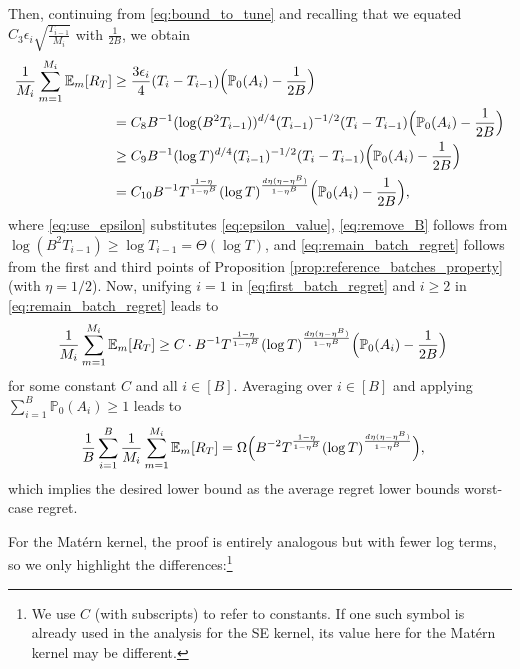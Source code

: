\documentclass[10pt]{article}
\begin{document}
Then, continuing from \eqref{eq:bound_to_tune} and recalling that we equated $C_{3}\epsilon_i \sqrt{\frac{T_{i-1}}{M_i}}$ with $\frac{1}{2B}$, we obtain
\begin{align}
    \frac{1}{M_i}\sum_{m=1}^{M_i}\mathbb{E}_m[R_T]
    & \geq \frac{3\epsilon_i}{4}(T_i-T_{i-1}) \Bigl(\mathbb{P}_0(A_i)- \frac{1}{2B} \Bigr) \label{eq:use_M} \\
    & = C_{8} B^{-1} (\log (B^2 T_{i-1}))^{d/4} (T_{i-1})^{-1/2}(T_i-T_{i-1}) \Bigl(\mathbb{P}_0(A_i)- \frac{1}{2B} \Bigr) \label{eq:use_epsilon} \\
    & \geq C_{9} B^{-1} (\log T)^{d/4} (T_{i-1})^{-1/2}(T_i-T_{i-1})\Bigl(\mathbb{P}_0(A_i)- \frac{1}{2B} \Bigr) \label{eq:remove_B} \\
    & = C_{10} B^{-1} T^{\frac{1-\eta}{1-\eta^B}}(\log T)^{\frac{d\eta(\eta-\eta^B)}{1-\eta^B}} \Bigl(\mathbb{P}_0(A_i)- \frac{1}{2B} \Bigr) \label{eq:remain_batch_regret},
\end{align}
where 
\eqref{eq:use_epsilon} substitutes \eqref{eq:epsilon_value}, 
\eqref{eq:remove_B} follows from $\log (B^2T_{i-1}) \geq \log T_{i-1} =\Theta(\log T)$,
and \eqref{eq:remain_batch_regret} follows from the first and third points of Proposition \ref{prop:reference_batches_property} (with $\eta = 1/2$).
Now, unifying $i=1$ in \eqref{eq:first_batch_regret} and $i\geq 2$ in \eqref{eq:remain_batch_regret} leads to
\begin{align}
    \frac{1}{M_i}\sum_{m=1}^{M_i}\mathbb{E}_m[R_T]
    & \geq C \cdot B^{-1} T^{\frac{1-\eta}{1-\eta^B}}(\log T)^{\frac{d\eta(\eta-\eta^B)}{1-\eta^B}} \Bigl(\mathbb{P}_0(A_i)- \frac{1}{2B} \Bigr)
\end{align}
for some constant $C$ and all $i\in[B]$. Averaging over $i\in [B]$ and applying $\sum_{i=1}^B \mathbb{P}_0(A_i) \geq 1 $ leads to
\begin{align}
    \frac{1}{B}\sum_{i=1}^B \frac{1}{M_i}\sum_{m=1}^{M_i}\mathbb{E}_m[R_T]
    & = \Omega\Bigl(B^{-2}T^{\frac{1-\eta}{1-\eta^B}}(\log T)^{\frac{d\eta(\eta-\eta^B)}{1-\eta^B}} \Bigr),
\end{align}
which implies the desired lower bound as the average regret lower bounds worst-case regret.

For the Mat\'ern kernel, the proof is entirely analogous but with fewer log terms, so we only highlight the differences:\footnote{We use $C$ (with subscripts) to refer to constants. If one such symbol is already used in the analysis for the SE kernel, its value here for the Mat\'ern kernel may be different.}
\end{document}
